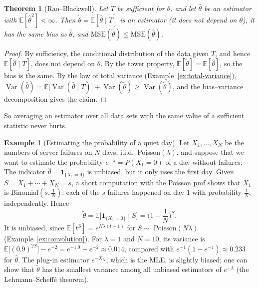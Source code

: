 \documentclass[11pt]{article}
\newcommand{\E}{\mathbb{E}}
\DeclareMathOperator{\Var}{Var}
\theoremstyle{definition}
\newtheorem{example}[definition]{Example}
\theoremstyle{plain}
\newtheorem{theorem}[definition]{Theorem}
\theoremstyle{remark}
\begin{document}
\begin{theorem}[Rao--Blackwell]\label{thm:rao-blackwell}
    Let $T$ be sufficient for $\theta$, and let $\hat\theta$ be an estimator with $\E[\hat\theta^2] < \infty$. Then $\tilde\theta = \E[\hat\theta \mid T]$ is an estimator (it does not depend on $\theta$), it has the same bias as $\hat\theta$, and $\mathrm{MSE}(\tilde\theta) \leq \mathrm{MSE}(\hat\theta)$.
\end{theorem}

\begin{proof}
    By sufficiency, the conditional distribution of the data given $T$, and hence $\E[\hat\theta \mid T]$, does not depend on $\theta$. By the tower property, $\E[\tilde\theta] = \E[\hat\theta]$, so the bias is the same. By the law of total variance (Example~\ref{ex:total-variance}), $\Var(\hat\theta) = \E\big[\Var(\hat\theta \mid T)\big] + \Var(\tilde\theta) \geq \Var(\tilde\theta)$, and the bias--variance decomposition gives the claim.
\end{proof}

So averaging an estimator over all data sets with the same value of a sufficient statistic never hurts.

\begin{example}[Estimating the probability of a quiet day]\label{ex:rao-blackwell}
    Let $X_1, \ldots, X_N$ be the numbers of server failures on $N$ days, i.i.d.\ Poisson$(\lambda)$, and suppose that we want to estimate the probability $e^{-\lambda} = P(X_1 = 0)$ of a day without failures. The indicator $\hat\theta = \mathbf{1}_{\{X_1 = 0\}}$ is unbiased, but it only uses the first day. Given $S = X_1 + \cdots + X_N = s$, a short computation with the Poisson pmf shows that $X_1$ is Binomial$(s, \frac{1}{N})$: each of the $s$ failures happened on day $1$ with probability $\frac{1}{N}$, independently. Hence
    \[\tilde\theta = \E\big[\mathbf{1}_{\{X_1 = 0\}} \mid S\big] = \Big(1 - \frac{1}{N}\Big)^S.\]
    It is unbiased, since $\E[t^S] = e^{N\lambda(t - 1)}$ for $S \sim$ Poisson$(N\lambda)$ (Example~\ref{ex:convolution}). For $\lambda = 1$ and $N = 10$, its variance is $\E\big[(0.9)^{2S}\big] - e^{-2} = e^{-1.9} - e^{-2} \approx 0.014$, compared with $e^{-1}(1 - e^{-1}) \approx 0.233$ for $\hat\theta$. The plug-in estimator $e^{-\bar X_N}$, which is the MLE, is slightly biased; one can show that $\tilde\theta$ has the smallest variance among all unbiased estimators of $e^{-\lambda}$ (the Lehmann--Scheff\'e theorem).
\end{example}
\end{document}
